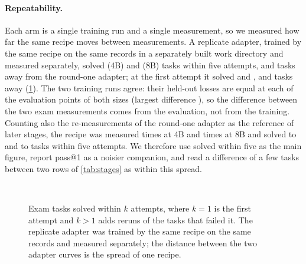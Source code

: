 \paragraph{Repeatability.} Each arm is a single training run and a single measurement, so we measured how far the
same recipe moves between measurements. A replicate adapter, trained by the same recipe on the same records in a
separately built work directory and measured separately, solved \examFourFirstFive{} (4B) and \examEightFirstFive{}
(8B) tasks within five attempts, \replicateFourFiveDiff{} and \replicateEightFiveDiff{} tasks away from the round-one
adapter; at the first attempt it solved \examFourFirstOne{} and \examEightFirstOne{}, \replicateFourOneDiff{} and
\replicateEightOneDiff{} tasks away (\cref{fig:withink}). The two training runs agree: their held-out losses are equal at each
of the \replicationCurvePoints{} evaluation points of both sizes (largest difference \replicationCurveMaxDiff{}), so the difference
between the two exam measurements comes from the evaluation, not from the training. Counting also the re-measurements of the round-one adapter
as the reference of later stages, the recipe was measured \roundOneFourRuns{} times at 4B and \roundOneEightRuns{}
times at 8B and solved \roundOneFourMin{} to \roundOneFourMax{} and \roundOneEightMin{} to \roundOneEightMax{} tasks
within five attempts. We therefore use solved within five as the main figure, report pass@1 as a noisier companion,
and read a difference of a few tasks between two rows of \cref{tab:stages} as within this spread.

\begin{figure}[t]
\centering
{}\\[1mm]
\caption{Exam tasks solved within $k$ attempts, where $k=1$ is the first attempt and $k>1$ adds reruns of the tasks that
  failed it. The replicate adapter was trained by the same recipe on the same records and measured separately; the
  distance between the two adapter curves is the spread of one recipe.}\label{fig:withink}
\end{figure}

